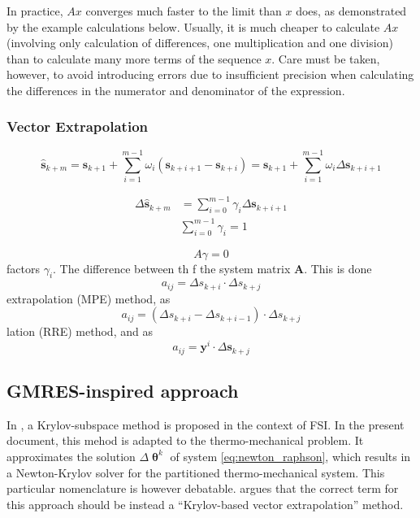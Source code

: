 In practice, \(A x\) converges much faster to the limit than \(x\) does, as demonstrated by the example calculations below. Usually, it is much cheaper to calculate \(A x\) (involving only calculation of differences, one multiplication and one division) than to calculate many more terms of the sequence \(x\). Care must be taken, however, to avoid introducing errors due to insufficient precision when calculating the differences in the numerator and denominator of the expression.


\subsubsection{Vector Extrapolation}

$$
\hat{\boldsymbol{s}}_{k+m}=\boldsymbol{s}_{k+1}+\sum_{i=1}^{m-1} \omega_{i}\left(\boldsymbol{s}_{k+i+1}-\boldsymbol{s}_{k+i}\right)=\boldsymbol{s}_{k+1}+\sum_{i=1}^{m-1} \omega_{i} \Delta \boldsymbol{s}_{k+i+1}
$$

$$
\begin{aligned}\Delta \hat{\boldsymbol{s}}_{k+m} &=\sum_{i=0}^{m-1} \gamma_{i} \Delta \boldsymbol{s}_{k+i+1} \\& \sum_{i=0}^{m-1} \gamma_{i}=1\end{aligned}
$$

\[
A \gamma=0
\]
factors \(\gamma_{i}\). The difference between th f the system matrix \(\boldsymbol{A}\). This is done
\[
a_{i j}=\Delta s_{k+i} \cdot \Delta s_{k+j}
\]
extrapolation (MPE) method, as
\[
a_{i j}=\left(\Delta s_{k+i}-\Delta s_{k+i-1}\right) \cdot \Delta s_{k+j}
\]
lation (RRE) method, and as
\[
a_{i j}=\boldsymbol{y}^{i} \cdot \Delta \boldsymbol{s}_{k+j}
\]

\subsection{GMRES-inspired approach}

In \cite{michler_interface_2005}, a Krylov-subspace method is proposed in the context of FSI.
In the present document, this mehod is adapted to the thermo-mechanical problem.
It approximates the solution $\Delta \bm{\uptheta}^{k}$ of system \eqref{eq:newton_raphson}, which results in a Newton-Krylov solver for the partitioned thermo-mechanical system.
This particular nomenclature is however debatable.
\cite{kuttler_vector_2009} argues that the correct term for this approach should be instead a “Krylov-based vector extrapolation” method. 

